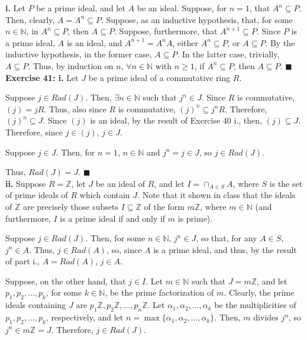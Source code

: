 \documentclass{article}%
\begin{document}
\textbf{i.} Let $P$ be a prime ideal, and let $A$ be an ideal.
Suppose, for
$n = 1$, that $A^n \subseteq P$. Then, clearly, $A = A^n \subseteq P$. Suppose,
as an inductive hypothesis, that, for some $n \in \mathbb{N}$, in $A^n \subseteq
P$, then $A \subseteq P$. Suppose, furthermore, that $A^{n + 1} \subseteq P$.
Since $P$ is a prime ideal, $A$ is an ideal, and $A^{n + 1} = A^nA$, either
$A^n \subseteq P$, or
$A \subseteq P$. By the inductive hypothesis, in the former case, $A \subseteq
P$. In the latter case, trivially, $A \subseteq P$. Thus, by induction on $n$,
$\forall n \in \mathbb{N}$ with $n \geq 1$, if $A^n \subseteq P$, then
$A \subseteq P$. \qquad $\blacksquare$ \\

\textbf{Exercise 41: i.} Let $J$ be a prime ideal of a commutative ring $R$.

Suppose $j \in Rad(J)$. Then, $\exists n \in \mathbb{N}$ such that $j^n \in
J$. Since $R$ is commutative, $(j) = jR$. Thus, also since $R$ is commutative,
$(j)^n \subseteq j^nR$. Therefore, $(j)^n \subseteq J$. Since $(j)$ is an
ideal, by the result of Exercise 40 i., then, $(j) \subseteq J$. Therefore,
since $j \in (j)$, $j \in J$.

Suppose $j \in J$. Then, for $n = 1$, $n \in \mathbb{N}$ and $j^n = j \in J$,
so $j \in Rad(J)$.

Thus, $Rad(J) = J$. \qquad $\blacksquare$ \\

\textbf{ii.} Suppose $R = \mathbb{Z}$, let $J$ be an ideal of $R$, and let
$I = \cap_{A \in S} A$, where $S$ is the set of prime ideals of $R$ which
contain $J$. Note that it shown in class that the ideals of $\mathbb{Z}$ are
precisely those subsets $I \subseteq \mathbb{Z}$ of the form $m\mathbb{Z}$,
where $m \in \mathbb{N}$ (and furthermore, $I$ is a prime ideal if and only if
$m$ is prime).

Suppose $j \in Rad(J)$. Then, for some $n \in \mathbb{N}$, $j^n \in J$, so
that, for any $A \in S$, $j^n \in A$. Thus, $j \in Rad(A)$, so, since $A$ is a
prime ideal, and thus, by the result of part i., $A = Rad(A)$, $j \in A$.

Suppose, on the other hand, that $j \in I$. Let $m \in \mathbb{N}$ such that
$J = m\mathbb{Z}$, and let $p_1,p_2,\ldots,p_k$, for some $k \in \mathbb{N}$,
be the prime factorization of $m$. Clearly, the prime ideals containing $J$
are $p_1\mathbb{Z}, p_2\mathbb{Z}, \ldots, p_n\mathbb{Z}$. Let $\alpha_1,
\alpha_2, \ldots, \alpha_k$ be the multiplicities of $p_1, p_2, \ldots, p_k$,
respectively, and let $n = \max\{\alpha_1, \alpha_2, \ldots, \alpha_k\}$.
Then, $m$ divides $j^n$, so $j^n \in m\mathbb{Z} = J$. Therefore, $j \in
Rad(J)$.
\end{document}
